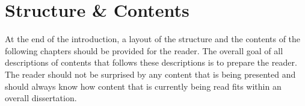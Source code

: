 





\section{Structure \& Contents}

At the end of the introduction, a layout of the structure and the contents of the following chapters should be provided for the reader. The overall goal of all descriptions of contents that follows these descriptions is to prepare the reader. The reader should not be surprised by any content that is being presented and should always know how content that is currently being read fits within an overall dissertation.